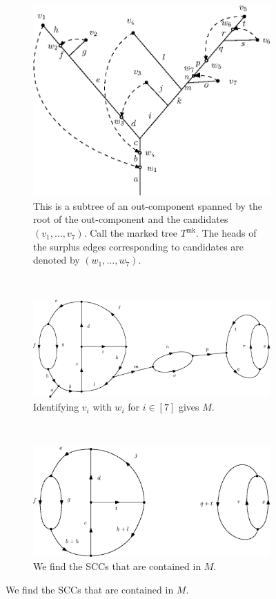 \begin{figure}
\centering
\begin{subfigure}{.7\textwidth}
 \centering
    \includegraphics[width=0.8\linewidth]{Content/Pictures/out_componentswithmarks.eps}
    \caption{This is a subtree of an out-component spanned by the root of the out-component and the candidates $(v_1,\dots,v_7)$. Call the marked tree $T^{\mathrm{mk}}$. The heads of the surplus edges corresponding to candidates are denoted by $(w_1,\dots,w_7)$. }
\label{figure.extractSCCs1}
\end{subfigure}\\
\vspace{1.5em}
\begin{subfigure}{.8\textwidth}
  \centering
  \includegraphics[width=0.9\linewidth]{Content/Pictures/identification.eps}
  \caption{Identifying $v_i$ with $w_i$ for $i\in [7]$ gives $M$.}
  \label{figure.extractSCCs2}
\end{subfigure}\\
\vspace{1.5em}
\begin{subfigure}{.8\textwidth}
  \centering
  \includegraphics[width=0.9\linewidth]{Content/Pictures/cutting.eps}
  \caption{We find the SCCs that are contained in $M$.}
  \label{figure.extractSCCs3}
\end{subfigure}


\end{figure}
